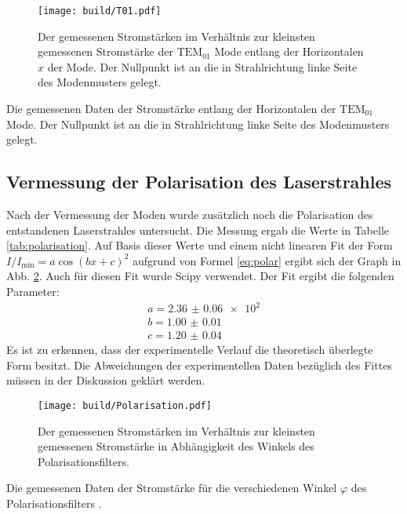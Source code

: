 \begin{figure}
	\centering
	\texttt{[image: build/T01.pdf]}
	\caption{Der gemessenen Stromstärken im Verhältnis zur kleinsten gemessenen Stromstärke der $\text{TEM}_{01}$ Mode entlang der Horizontalen $x$ der Mode. Der Nullpunkt ist an die in Strahlrichtung linke Seite des Modenmusters gelegt.}
	\label{fig:T01}
\end{figure}

\begin{table}
	\centering
	\caption{Die gemessenen Daten der Stromstärke entlang der Horizontalen der $\text{TEM}_{\text{01}}$ Mode. Der Nullpunkt ist an die in Strahlrichtung linke Seite des Modenmusters gelegt.}
	
	
	\label{tab:T01}
\end{table}

\subsection{Vermessung der Polarisation des Laserstrahles}
Nach der Vermessung der Moden wurde zusätzlich noch die Polarisation des entstandenen Laserstrahles untersucht. Die Messung ergab die Werte in Tabelle \ref{tab:polarisation}. Auf Basis dieser Werte und einem nicht linearen Fit der Form $I/I_\text{min} = a  \cos(b x + c)^2$
 aufgrund von Formel \eqref{eq:polar} ergibt sich der Graph in Abb. \ref{fig:polarisation}. Auch für diesen Fit wurde Scipy \cite{scipy} verwendet. Der Fit ergibt die folgenden Parameter:
 \begin{gather*}
	a = \num{2.36(6)e2}\\
	b = \num{1.00(1)}\\
	c = \num{1.20(4)}
	\end{gather*}
Es ist zu erkennen, dass der experimentelle Verlauf die theoretisch überlegte Form besitzt. Die Abweichungen der experimentellen Daten bezüglich des Fittes müssen in der Diskussion geklärt werden.
\begin{figure}
	\centering
	\texttt{[image: build/Polarisation.pdf]}
	\caption{Der gemessenen Stromstärken im Verhältnis zur kleinsten gemessenen Stromstärke in Abhängigkeit des Winkels des Polarisationsfilters.}
	\label{fig:polarisation}
\end{figure}


\begin{table}
	\centering
	\caption{Die gemessenen Daten der Stromstärke für die verschiedenen Winkel $\varphi$ des Polarisationsfilters .}
	
	\label{tab:polarisation}
\end{table}


